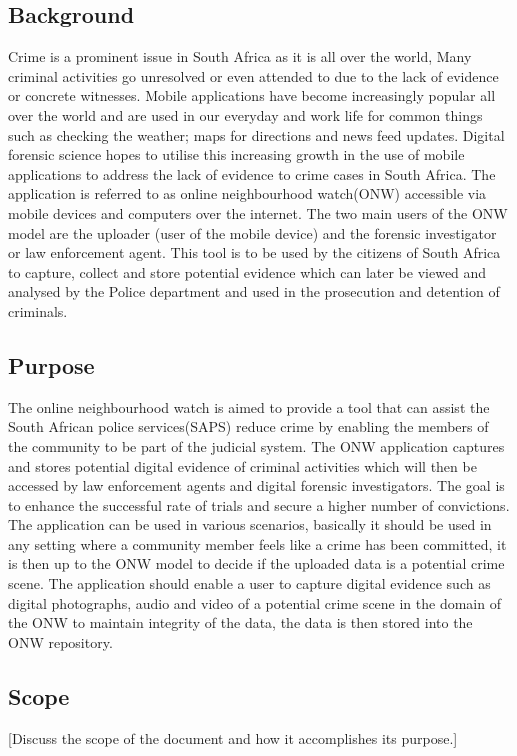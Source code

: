 \documentclass[a4paper,12pt]{article}
\begin{document}
\subsection{Background}
Crime is a prominent issue in South Africa as it is all over the world, Many criminal activities go unresolved or even attended to due to the lack of evidence or concrete witnesses.  Mobile applications have become increasingly popular all over the world and are used in our everyday and work life for common things such as checking the weather; maps for directions and news feed updates.  Digital forensic science hopes to utilise this increasing growth in the use of mobile applications to address the lack of evidence to crime cases in South Africa.
The application is referred to as online neighbourhood watch(ONW) accessible via mobile devices and computers over the internet.  The two main users of the ONW model are the uploader (user of the mobile device) and the forensic investigator or law enforcement agent. 
This tool is to be used by the citizens of South Africa to capture, collect and store potential evidence which can later be viewed and analysed by the Police department and used in the prosecution and detention of criminals.
\subsection{Purpose}
The online neighbourhood watch is aimed to provide a tool that can assist the South African police services(SAPS) reduce crime by enabling the members of the community to be part of the judicial system.  The ONW application captures and stores potential digital evidence of criminal activities which will then be accessed by law enforcement agents and digital forensic investigators.  The goal is to enhance the successful rate of trials and secure a higher number of convictions.
The application can be used in various scenarios, basically it should be used in any setting where a community member feels like a crime has been committed, it is then up to the ONW model to decide if the uploaded data is a potential crime scene. The application should enable a user to capture digital evidence such as digital photographs, audio and video of a potential crime scene in the domain of the ONW to maintain integrity of the data, the data is then stored into the ONW repository.
\subsection{Scope}
[Discuss the scope of the document and how it accomplishes its purpose.]
\end{document}
